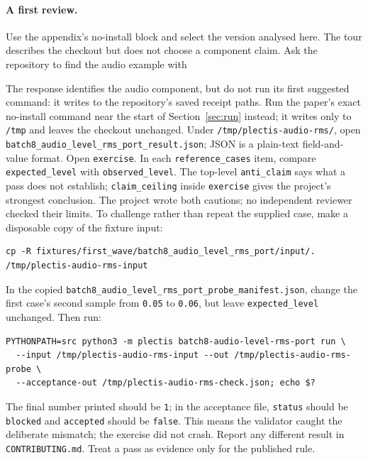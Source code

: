\documentclass[11pt]{article}
\newcommand{\code}[1]{\texttt{#1}}
\newcommand{\component}[1]{\nolinkurl{#1}}
\begin{document}
\paragraph{A first review.} Use the appendix's no-install block and select the
version analysed here. The tour describes the checkout but does not choose a
component claim. Ask the repository to find the audio example with
\par{}\par
The response identifies the audio component, but do not run its first suggested
command: it writes to the repository's saved receipt paths. Run the paper's exact
no-install command near the start of Section~\ref{sec:run} instead; it writes only
to \code{/tmp} and leaves the checkout unchanged. Under
\component{/tmp/plectis-audio-rms/}, open
\component{batch8_audio_level_rms_port_result.json};
JSON is a plain-text field-and-value format. Open \code{exercise}. In each
\component{reference_cases} item, compare \code{expected\_level} with
\code{observed\_level}. The top-level \component{anti_claim} says what a pass
does not establish; \component{claim_ceiling} inside \code{exercise} gives the
project's strongest conclusion. The project wrote both cautions; no independent
reviewer checked their limits. To challenge rather than repeat the supplied case,
make a disposable copy of the fixture input:
\begin{Verbatim}[fontsize=\scriptsize]
cp -R fixtures/first_wave/batch8_audio_level_rms_port/input/. /tmp/plectis-audio-rms-input
\end{Verbatim}
In the copied \component{batch8_audio_level_rms_port_probe_manifest.json},
change the first case's second sample from \code{0.05} to \code{0.06}, but
leave \code{expected\_level} unchanged. Then run:
\begin{Verbatim}[fontsize=\scriptsize]
PYTHONPATH=src python3 -m plectis batch8-audio-level-rms-port run \
  --input /tmp/plectis-audio-rms-input --out /tmp/plectis-audio-rms-probe \
  --acceptance-out /tmp/plectis-audio-rms-check.json; echo $?
\end{Verbatim}
The final number printed should be \code{1}; in the acceptance file,
\code{status} should be \code{blocked} and \code{accepted} should be
\code{false}. This means the validator caught the deliberate mismatch; the
exercise did not crash. Report any different result in
\code{CONTRIBUTING.md}. Treat a pass as evidence only for the published rule.
\end{document}
